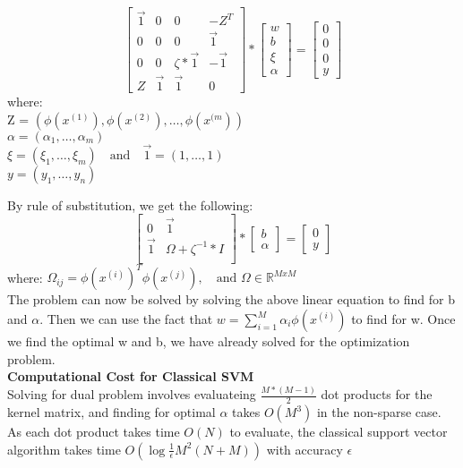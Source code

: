 \documentclass[11pt]{article}
\begin{document}
\[
\begin{bmatrix}
\vec{1} & 0 & 0 & -Z^T \\ 
0 & 0 & 0 & \vec{1} \\
0 & 0 & \zeta*\vec{1} & -\vec{1} \\
Z & \vec{1} & \vec{1} & 0  
\end{bmatrix}
* 
\begin{bmatrix}
w \\ b \\ \xi \\ \alpha
\end{bmatrix}
= 
\begin{bmatrix}
0 \\ 0 \\ 0 \\ y
\end{bmatrix}
\]
where: \\
Z = $(\phi(x^{(1)}), \phi(x^{(2)}), \dots, \phi(x^{(m}))$ \\
$\alpha = (\alpha_{1}, \dots, \alpha_{m})$ \\
$\xi = (\xi_{1}, \dots , \xi_{m}) \quad \text{and} \quad \vec{1} = (1, \dots, 1)$ \\
$y = (y_{1}, \dots, y_{n})$

By rule of substitution, we get the following: 
\[
\begin{bmatrix}
0 & \vec{1} \\
\vec{1} & \Omega + \zeta^{-1} * I \\
\end{bmatrix}
*
\begin{bmatrix}
b \\ \alpha
\end{bmatrix}
=
\begin{bmatrix}
0 \\ y
\end{bmatrix}
\]
where:
$\Omega_{ij} = {\phi(x^{(i)})}^{T}\phi(x^{(j)}), \quad \text{and }  \Omega \in \mathbb{R}^{MxM}$ \\

The problem can now be solved by solving the above linear equation to find for b and $\alpha$. Then we can use the fact that $w = \sum_{i=1}^{M} \alpha_{i} \phi(x^{(i)})$ to find for w. Once we find the optimal w and b, we have already solved for the optimization problem.  \\

\textbf{Computational Cost for Classical SVM} \\

Solving for dual problem involves evaluateing $\frac{M*(M-1)}{2}$ dot products for the kernel matrix, and finding for optimal $\alpha$ takes $O(M^{3})$ in the non-sparse case. As each dot product takes time $O(N)$ to evaluate, the classical support vector algorithm takes time $O(\log \frac{1}{\epsilon} M^{2} (N+M))$ with accuracy $\epsilon$ \\
\end{document}
